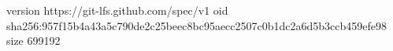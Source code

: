 version https://git-lfs.github.com/spec/v1
oid sha256:957f15b4a43a5c790de2c25beec8bc95aecc2507c0b1dc2a6d5b3ccb459efe98
size 699192

